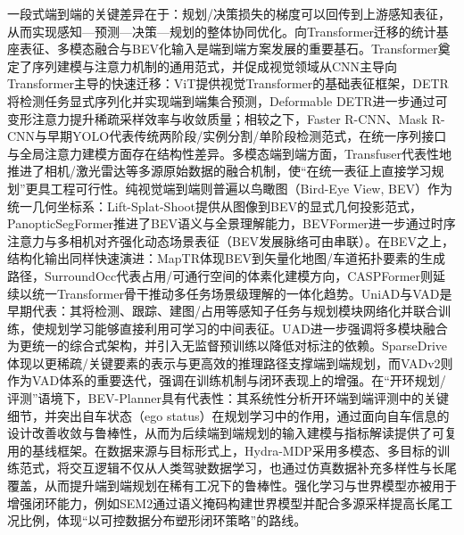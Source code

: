     一段式端到端的关键差异在于：规划/决策损失的梯度可以回传到上游感知表征，从而实现感知—预测—决策—规划的整体协同优化。向Transformer迁移的统计基座表征、多模态融合与BEV化输入是端到端方案发展的重要基石。Transformer\cite{AttnIsAllYouNeed2017}奠定了序列建模与注意力机制的通用范式，并促成视觉领域从CNN主导向Transformer主导的快速迁移：ViT\cite{ViT2021}提供视觉Transformer的基础表征框架，DETR\cite{DETR2020}将检测任务显式序列化并实现端到端集合预测，Deformable DETR\cite{Deformable_DETR2021}进一步通过可变形注意力提升稀疏采样效率与收敛质量；相较之下，Faster R-CNN\cite{Faster_RCNN2016}、Mask R-CNN\cite{MaskRCNN2018}与早期YOLO\cite{YOLOv12016}代表传统两阶段/实例分割/单阶段检测范式，在统一序列接口与全局注意力建模方面存在结构性差异。多模态端到端方面，Transfuser\cite{Transfuser2023}代表性地推进了相机/激光雷达等多源原始数据的融合机制，使“在统一表征上直接学习规划”更具工程可行性。纯视觉端到端则普遍以鸟瞰图（Bird-Eye View, BEV）作为统一几何坐标系：Lift-Splat-Shoot\cite{LSS_Lift_Splat_Shoot_BEV2020}提供从图像到BEV的显式几何投影范式，PanopticSegFormer\cite{PanopticSegFormer2022}推进了BEV语义与全景理解能力，BEVFormer\cite{BevFormer2022}进一步通过时序注意力与多相机对齐强化动态场景表征（BEV发展脉络可由\cite{LSS_Lift_Splat_Shoot_BEV2020,PanopticSegFormer2022,BevFormer2022}串联）。在BEV之上，结构化输出同样快速演进：MapTR\cite{MapTR2023}体现BEV到矢量化地图/车道拓扑要素的生成路径，SurroundOcc\cite{SurrondOcc2023}代表占用/可通行空间的体素化建模方向，CASPFormer\cite{CASPFormer2024}则延续以统一Transformer骨干推动多任务场景级理解的一体化趋势。UniAD\cite{hu2022uniAD}与VAD\cite{jiang2023vad}是早期代表：其将检测、跟踪、建图/占用等感知子任务与规划模块网络化并联合训练，使规划学习能够直接利用可学习的中间表征。UAD\cite{guo2024UAD}进一步强调将多模块融合为更统一的综合式架构，并引入无监督预训练以降低对标注的依赖。SparseDrive\cite{SparseDrive2024}体现以更稀疏/关键要素的表示与更高效的推理路径支撑端到端规划，而VADv2\cite{VADv2_2024}则作为VAD体系的重要迭代，强调在训练机制与闭环表现上的增强。在“开环规划/评测”语境下，BEV-Planner\cite{li2024bev_planner}具有代表性：其系统性分析开环端到端评测中的关键细节，并突出自车状态（ego status）在规划学习中的作用，通过面向自车信息的设计改善收敛与鲁棒性，从而为后续端到端规划的输入建模与指标解读提供了可复用的基线框架。在数据来源与目标形式上，Hydra-MDP\cite{li2024hydramdp}采用多模态、多目标的训练范式，将交互逻辑不仅从人类驾驶数据学习，也通过仿真数据补充多样性与长尾覆盖，从而提升端到端规划在稀有工况下的鲁棒性。强化学习与世界模型亦被用于增强闭环能力，例如SEM2\cite{gao2022sem2_worldmodel}通过语义掩码构建世界模型并配合多源采样提高长尾工况比例，体现“以可控数据分布塑形闭环策略”的路线。

